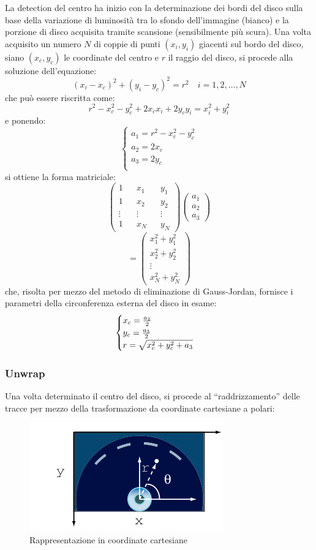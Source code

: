 La detection del centro ha inizio con la determinazione dei bordi del disco sulla base della variazione di luminosit\`a tra lo sfondo dell'immagine (bianco) e la porzione di disco acquisita tramite scansione (sensibilmente pi\`u scura).
Una volta acquisito un numero $N$ di coppie di punti $(x_i,y_i)$ giacenti sul bordo del disco, siano $(x_c, y_c)$ le coordinate del centro e $r$ il raggio del disco, si procede alla soluzione dell'equazione:
$$(x_i-x_c)^2+(y_i-y_c)^2=r^2 \quad i=1,2,\ldots,N$$
che pu\`o essere riscritta come:
$$r^2-x_c^2-y_c^2+2x_cx_i+2y_cy_i = x_i^2+y_i^2$$
e ponendo:
$$
\begin{cases}
a_1= r^2 - x_c^2 - y_c^2\\
a_2 = 2x_c\\
a_3 = 2y_c\\
\end{cases}
$$
si ottiene la forma matriciale:
$$
\begin{pmatrix}
1 && x_1 && y_1\\
1 && x_2 && y_2\\
\vdots && \vdots && \vdots\\
1 && x_N && y_N
\end{pmatrix}
\begin{pmatrix}
a_1 \\
a_2 \\
a_3
\end{pmatrix}
$$
$$
=
\begin{pmatrix}
x_1^2+y_1^2\\
x_2^2+y_2^2\\
\vdots \\
x_N^2+y_N^2
\end{pmatrix}
$$
che, risolta per mezzo del metodo di eliminazione di Gauss-Jordan, fornisce i parametri della circonferenza esterna del disco in esame:
$$
\begin{cases}
	x_c ={a_2\over{2}} \\
	y_c = {a_3\over{2}}\\
	r = \sqrt{x_c^2+y_c^2 + a_3}\\
\end{cases}
$$
\subsubsection{Unwrap}
Una volta determinato il centro del disco, si procede al ``raddrizzamento'' delle tracce per mezzo della trasformazione da coordinate cartesiane a polari:
\begin{figure}[h!t]
\begin{center}
\includegraphics[scale=0.5]{./img/cartesio.png}
\caption{Rappresentazione in coordinate cartesiane}\label{cartesio}
\end{center}
\end{figure}

